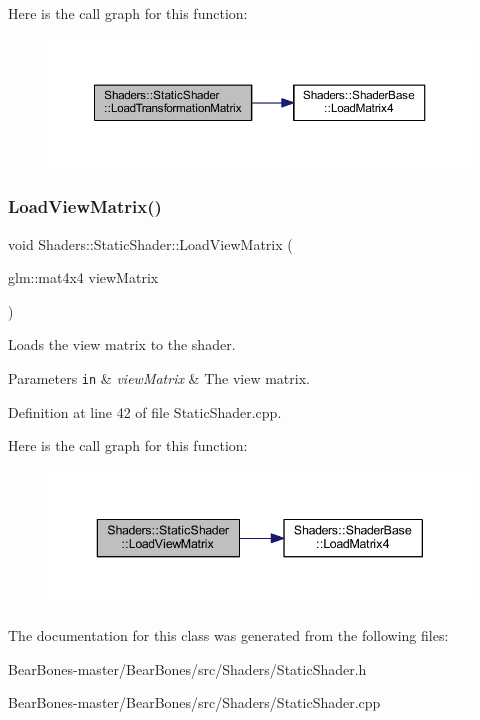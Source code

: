 Here is the call graph for this function\+:
\nopagebreak
\begin{figure}[H]
\begin{center}
\leavevmode
\includegraphics[width=350pt]{class_shaders_1_1_static_shader_ab0241a6caf6b7a9fe48b35da63a1cefb_cgraph}
\end{center}
\end{figure}
\mbox{\label{class_shaders_1_1_static_shader_aacb252f60950b03d3aa0dc0abc92d768}} 
\subsubsection{\texorpdfstring{Load\+View\+Matrix()}{LoadViewMatrix()}}
{\footnotesize\ttfamily void Shaders\+::\+Static\+Shader\+::\+Load\+View\+Matrix (\begin{DoxyParamCaption}\item[{glm\+::mat4x4}]{view\+Matrix }\end{DoxyParamCaption})}

Loads the view matrix to the shader. 
\begin{DoxyParams}[1]{Parameters}
\mbox{\tt in}  & {\em view\+Matrix} & The view matrix. \\
\hline
\end{DoxyParams}


Definition at line 42 of file Static\+Shader.\+cpp.

Here is the call graph for this function\+:
\nopagebreak
\begin{figure}[H]
\begin{center}
\leavevmode
\includegraphics[width=343pt]{class_shaders_1_1_static_shader_aacb252f60950b03d3aa0dc0abc92d768_cgraph}
\end{center}
\end{figure}


The documentation for this class was generated from the following files\+:\begin{DoxyCompactItemize}
\item 
Bear\+Bones-\/master/\+Bear\+Bones/src/\+Shaders/Static\+Shader.\+h\item 
Bear\+Bones-\/master/\+Bear\+Bones/src/\+Shaders/Static\+Shader.\+cpp\end{DoxyCompactItemize}
